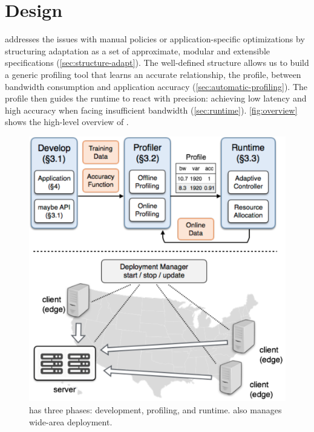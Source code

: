 \section{\sysname{} Design}
\label{sec:system}

\sysname{} addresses the issues with manual policies or application-specific
optimizations by structuring adaptation as a set of approximate, modular and
extensible specifications (\autoref{sec:structure-adapt}). The well-defined
structure allows us to build a generic profiling tool that learns an accurate
relationship, the profile, between bandwidth consumption and application
accuracy (\autoref{sec:automatic-profiling}). The profile then guides the
runtime to react with precision: achieving low latency and high accuracy when
facing insufficient bandwidth (\autoref{sec:runtime}). \autoref{fig:overview}
shows the high-level overview of \sysname{}.

\begin{figure}
  \centering
  \includegraphics[width=0.9\linewidth]{figures/system.pdf}
  \vspace{-0.5em}
  \caption{\sysname{} has three phases: development, profiling, and runtime.
    \sysname{} also manages wide-area deployment.}
  \label{fig:overview}
  \vspace{-0.5em}
\end{figure}





